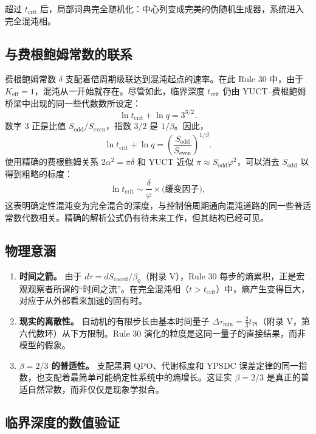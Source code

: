 \documentclass[12pt,a4paper]{article}
\begin{document}
	超过 \(t_{\mathrm{crit}}\) 后，局部词典完全随机化：中心列变成完美的伪随机生成器，系统进入完全混沌相。
	
	\subsection{与费根鲍姆常数的联系}
	\label{subsec:feigenbaum-link}
	
	费根鲍姆常数 \(\delta\) 支配着倍周期级联达到混沌起点的速率。在此 Rule 30 中，由于 \(K_{\mathrm{eff}}=1\)，混沌从一开始就存在。尽管如此，临界深度 \(t_{\mathrm{crit}}\) 仍由 YUCT–费根鲍姆桥梁中出现的同一些代数数所设定：
	\[
	\ln t_{\mathrm{crit}} + \ln q = 3^{3/2}.
	\]
	数字 \(3\) 正是比值 \(S_{\mathrm{odd}}/S_{\mathrm{even}}\)，指数 \(3/2\) 是 \(1/\beta\)。因此，
	\[
	\ln t_{\mathrm{crit}} + \ln q =
	\left(\frac{S_{\mathrm{odd}}}{S_{\mathrm{even}}}\right)^{\!1/\beta}.
	\]
	使用精确的费根鲍姆关系 \(2\alpha^{2} = \pi\delta\) 和 YUCT 近似 \(\pi \approx S_{\mathrm{odd}}\varphi^{2}\)，可以消去 \(S_{\mathrm{odd}}\) 以得到粗略的标度：
	\[
	\ln t_{\mathrm{crit}} \sim \frac{\delta}{\varphi} \times
	\bigl(\text{缓变因子}\bigr),
	\]
	这表明确定性混沌变为完全混合的深度，与控制倍周期通向混沌道路的同一些普适常数代数相关。精确的解析公式仍有待未来工作，但其结构已经可见。
	
	\subsection{物理意涵}
	\label{subsec:implications}
	
	\begin{enumerate}
		\item \textbf{时间之箭。} 由于 \(d\tau = dS_{\mathrm{coord}}/\beta_{0}\)（附录 V），Rule 30 每步的熵累积，正是宏观观察者所谓的“时间之流”。在完全混沌相（\(t > t_{\mathrm{crit}}\)）中，熵产生变得巨大，对应于从外部看来加速的固有时。
		\item \textbf{现实的离散性。} 自动机的有限步长由基本时间量子 \(\Delta\tau_{\min} = \frac{2}{3}t_{\mathrm{Pl}}\)（附录 V，第六代数环）从下方限制。Rule 30 演化的粒度是这同一量子的直接结果，而非模型的假象。
		\item \textbf{\(\beta=2/3\) 的普适性。} 支配黑洞 QPO、代谢标度和 YPSDC 误差定律的同一指数，也支配着最简单可能确定性系统中的熵增长。这证实 \(\beta=2/3\) 是真正的普适自然常数，而非仅仅是现象学拟合。
	\end{enumerate}
	
	\subsection{临界深度的数值验证}
	\label{subsec:verification}
	
\end{document}
